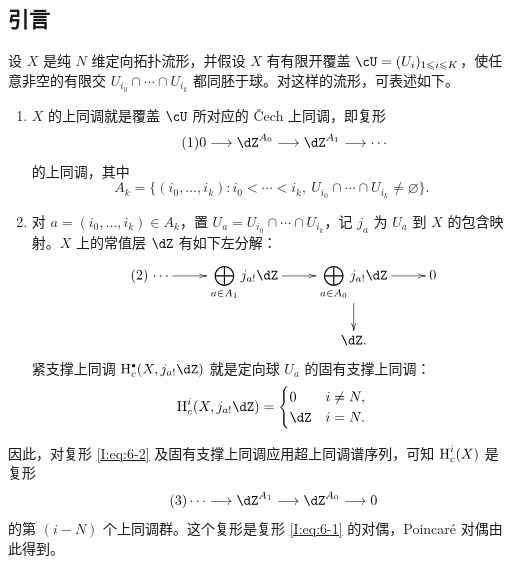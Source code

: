 \subsection{引言}\label{I:6-1}
设 $X$ 是纯 $N$ 维定向拓扑流形，并假设 $X$ 有有限开覆盖 $\cU=(U_i)_{1\leqslant i\leqslant K}$，使任意非空的有限交 $U_{i_0}\cap\cdots\cap U_{i_k}$ 都同胚于球。对这样的流形，可表述如下。
\begin{enumerate}[\indent A.]
\item $X$ 的上同调就是覆盖 $\cU$ 所对应的 Čech 上同调，即复形
\begin{equation*}\tag{1}\label{I:eq:6-1}
0\longrightarrow\dZ^{A_0}\longrightarrow\dZ^{A_1}\longrightarrow\cdots
\end{equation*}
的上同调，其中
\[
A_k=\{(i_0,\dotsc,i_k):i_0<\cdots<i_k,\ U_{i_0}\cap\cdots\cap U_{i_k}\ne\varnothing\}.
\]
\item 对 $a=(i_0,\dotsc,i_k)\in A_k$，置 $U_a=U_{i_0}\cap\cdots\cap U_{i_k}$，记 $j_a$ 为 $U_a$ 到 $X$ 的包含映射。$X$ 上的常值层 $\dZ$ 有如下左分解：
\begin{equation*}\tag{2}\label{I:eq:6-2}
\xymatrix{
\cdots\ar[r]&\displaystyle\bigoplus_{a\in A_1}j_{a!}\dZ\ar[r]&\displaystyle\bigoplus_{a\in A_0}j_{a!}\dZ\ar[r]\ar[d]&0\\
&&\dZ.
}
\end{equation*}
紧支撑上同调 $\h_c^\bullet(X,j_{a!}\dZ)$ 就是定向球 $U_a$ 的固有支撑上同调：
\[
\h_c^i(X,j_{a!}\dZ)=
\begin{cases}0&i\ne N,\\\dZ&i=N.\end{cases}
\]
\end{enumerate}
因此，对复形 \eqref{I:eq:6-2} 及固有支撑上同调应用超上同调谱序列，可知 $\operatorname{H}_c^i(X)$ 是复形
\begin{equation*}\tag{3}\label{I:eq:6-3}
\cdots\longrightarrow\dZ^{A_1}\longrightarrow\dZ^{A_0}\longrightarrow0
\end{equation*}
的第 $(i-N)$ 个上同调群。这个复形是复形 \eqref{I:eq:6-1} 的对偶，Poincaré 对偶由此得到。

